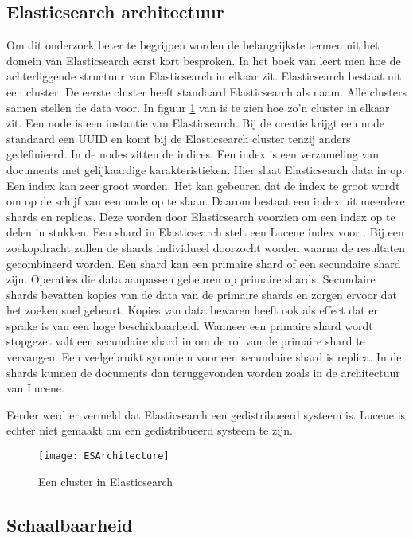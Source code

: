 \subsection{Elasticsearch architectuur}

Om dit onderzoek beter te begrijpen worden de belangrijkste termen uit het domein van Elasticsearch eerst kort besproken. In het boek van \textcite{Dixit2016} leert men hoe de achterliggende structuur van Elasticsearch in elkaar zit. Elasticsearch bestaat uit een cluster. De eerste cluster heeft standaard Elasticsearch als naam. Alle clusters samen stellen de data voor. In figuur \ref{fig:ESArchitecture} van \textcite{Babaev2013} is te zien hoe zo'n cluster in elkaar zit. Een node is een instantie van Elasticsearch. Bij de creatie krijgt een node standaard een UUID en komt bij de Elasticsearch cluster tenzij anders gedefinieerd. In de nodes zitten de indices. Een index is een verzameling van documents met gelijkaardige karakteristieken. Hier slaat Elasticsearch data in op. Een index kan zeer groot worden. Het kan gebeuren dat de index te groot wordt om op de schijf van een node op te slaan. Daarom bestaat een index uit meerdere shards en replicas. Deze worden door Elasticsearch voorzien om een index op te delen in stukken. Een shard in Elasticsearch stelt een Lucene index voor \autocite{Brasetvik2017}. Bij een zoekopdracht zullen de shards individueel doorzocht worden waarna de resultaten gecombineerd worden. Een shard kan een primaire shard of een secundaire shard zijn. Operaties die data aanpassen gebeuren op primaire shards. Secundaire shards bevatten kopies van de data van de primaire shards en zorgen ervoor dat het zoeken snel gebeurt. Kopies van data bewaren heeft ook als effect dat er sprake is van een hoge beschikbaarheid. Wanneer een primaire shard wordt stopgezet valt een secundaire shard in om de rol van de primaire shard te vervangen. Een veelgebruikt synoniem voor een secundaire shard is replica. In de shards kunnen de documents dan teruggevonden worden zoals in de architectuur van Lucene.

Eerder werd er vermeld dat Elasticsearch een gedistribueerd systeem is. Lucene is echter niet gemaakt om een gedistribueerd systeem te zijn.

\begin{figure}
	\centering
	\texttt{[image: ESArchitecture]}
	\caption{Een cluster in Elasticsearch}
	\label{fig:ESArchitecture}
\end{figure}

\subsection{Schaalbaarheid}


